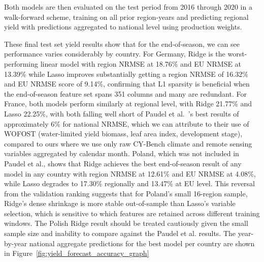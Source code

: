 \documentclass[pdflatex,sn-mathphys-num, oneside]{sn-jnl}%
\theoremstyle{thmstyleone}%
\theoremstyle{thmstyletwo}%
\theoremstyle{thmstylethree}%
\begin{document}
Both models are then evaluated on the test period from 2016 through 2020 in a walk-forward scheme, training on all prior region-years and predicting regional yield with predictions aggregated to national level using production weights.

These final test set yield results show that for the end-of-season, we can see performance varies considerably by country. For Germany, Ridge is the worst-performing linear model with region NRMSE at 18.76\% and EU NRMSE at 13.39\% while Lasso improves substantially getting a region NRMSE of 16.32\% and EU NRMSE score of 9.14\%, confirming that L1 sparsity is beneficial when the end-of-season feature set spans 351 columns and many are redundant. For France, both models perform similarly at regional level, with Ridge 21.77\% and Lasso 22.25\%, with both falling well short of Paudel et al.~\cite{bib16}'s best results of approximately 6\% for national NRMSE, which we can attribute to their use of WOFOST (water-limited yield biomass, leaf area index, development stage), compared to ours where we use only raw CY-Bench climate and remote sensing variables aggregated by calendar month. Poland, which was not included in Paudel et al.\cite{bib16}, shows that Ridge achieves the best end-of-season result of any model in any country with region NRMSE at 12.61\% and EU NRMSE at 4.08\%, while Lasso degrades to 17.30\% regionally and 13.47\% at EU level. This reversal from the validation ranking suggests that for Poland's small 16-region sample, Ridge's dense shrinkage is more stable out-of-sample than Lasso's variable selection, which is sensitive to which features are retained across different training windows. The Polish Ridge result should be treated cautiously given the small sample size and inability to compare against the Paudel et al.\cite{bib16} results. The year-by-year national aggregate predictions for the best model per country are shown in Figure~\ref{fig:yield_forecast_accuracy_graph}
\end{document}
